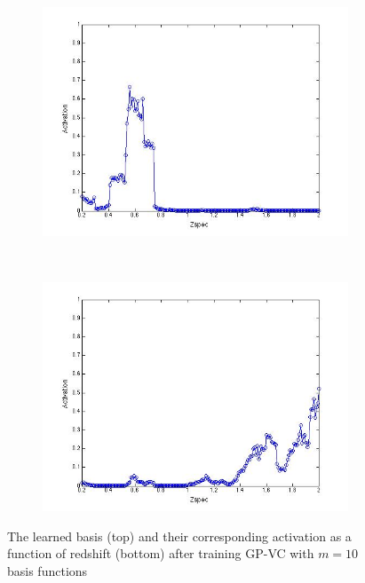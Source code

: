 \documentclass[useAMS,usenatbib,fleqn]{mn2e}
\begin{document}
\begin{figure}
\begin{subfigure}[b]{0.075\textwidth}
                \includegraphics[trim = 35px 15px 50px 25px, clip=true,width=\textwidth]{figures/activation_09.jpg}
        \end{subfigure}
        ~
        \begin{subfigure}[b]{0.075\textwidth}
                \includegraphics[trim = 35px 15px 50px 25px, clip=true,width=\textwidth]{figures/activation_10.jpg}
        \end{subfigure}
        
        
       \caption{The learned basis (top) and their corresponding activation as a function of redshift (bottom) after training GP-VC with $m=10$ basis functions}
	\label{fig-kernel-activations}
\end{figure}
\end{document}
